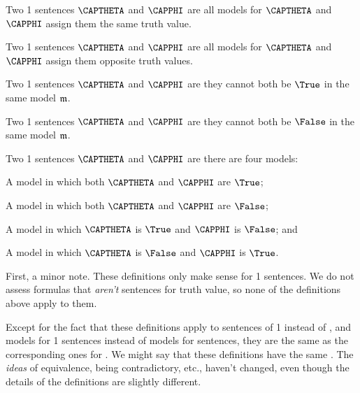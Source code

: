 \begin{majorILnc}{}
Two \GQL{}1 sentences $\CAPTHETA$ and $\CAPPHI$ are  \Iff all models for $\CAPTHETA$ and $\CAPPHI$ assign them the same truth value.
\end{majorILnc}
\begin{majorILnc}{}
Two \GQL{}1 sentences $\CAPTHETA$ and $\CAPPHI$ are  \Iff all models for $\CAPTHETA$ and $\CAPPHI$ assign them opposite truth values.
\end{majorILnc}
\begin{majorILnc}{}
Two \GQL{}1 sentences $\CAPTHETA$ and $\CAPPHI$ are  \Iff they cannot both be $\True$ in the same model $\mathfrak{m}$.
\end{majorILnc}
\begin{majorILnc}{}
Two \GQL{}1 sentences $\CAPTHETA$ and $\CAPPHI$ are  \Iff they cannot both be $\False$ in the same model $\mathfrak{m}$.
\end{majorILnc}
\begin{majorILnc}{}
Two \GQL{}1 sentences $\CAPTHETA$ and $\CAPPHI$ are  \Iff there are four models:
\begin{cenumerate}
	\item A model in which both $\CAPTHETA$ and $\CAPPHI$ are $\True$; 
	\item A model in which both $\CAPTHETA$ and $\CAPPHI$ are $\False$;
	\item A model in which $\CAPTHETA$ is $\True$ and $\CAPPHI$ is $\False$; and
	\item A model in which $\CAPTHETA$ is $\False$ and $\CAPPHI$ is $\True$.
\end{cenumerate}
\end{majorILnc}

First, a minor note.
These definitions only make sense for \GQL{}1 sentences.
We do not assess formulas that \emph{aren't} sentences for truth value, so none of the definitions above apply to them. 

Except for the fact that these definitions apply to sentences of \GQL{}1 instead of \GSL{}, and models for \GQL{}1 sentences instead of models for \GSL{} sentences, they are the same as the corresponding ones for \GSL{}. 
We might say that these definitions have the same . 
The \emph{ideas} of equivalence, being contradictory, etc., haven't changed, even though the details of the definitions are slightly different.

